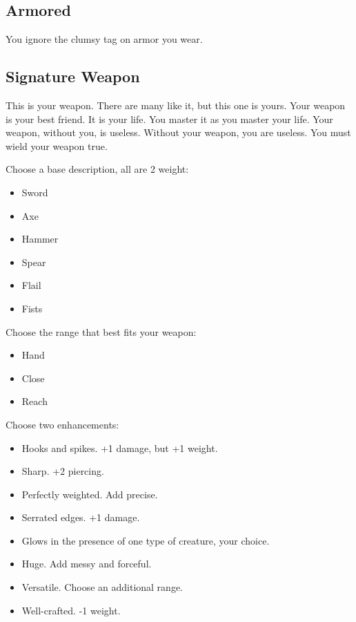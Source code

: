 \subsection{Armored}


 You ignore the clumsy tag on armor you wear.
\subsection{Signature Weapon}


 This is your weapon. There are many like it, but this one is yours. Your weapon is your best friend. It is your life. You master it as you master your life. Your weapon, without you, is useless. Without your weapon, you are useless. You must wield your weapon true.


 Choose a base description, all are 2 weight:
\begin{itemize}
\item Sword
\item Axe
\item Hammer
\item Spear
\item Flail
\item Fists

\end{itemize}


 Choose the range that best fits your weapon:
\begin{itemize}
\item Hand
\item Close
\item Reach

\end{itemize}


 Choose two enhancements:
\begin{itemize}
\item Hooks and spikes. +1 damage, but +1 weight.
\item Sharp. +2 piercing.
\item Perfectly weighted. Add precise.
\item Serrated edges. +1 damage.
\item Glows in the presence of one type of creature, your choice.
\item Huge. Add messy and forceful.
\item Versatile. Choose an additional range.
\item Well-crafted. -1 weight.

\end{itemize}


